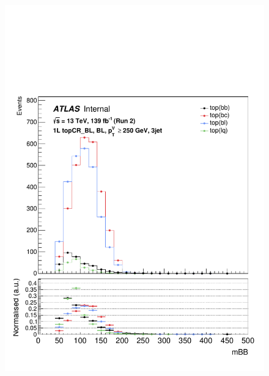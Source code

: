 \begin{figure}[h!]
\includegraphics[scale=0.253]{Images/VH/top/OneLepton_top_1bltag3jet_topCR_BL_250ptv_mBB.pdf}

\end{figure}
